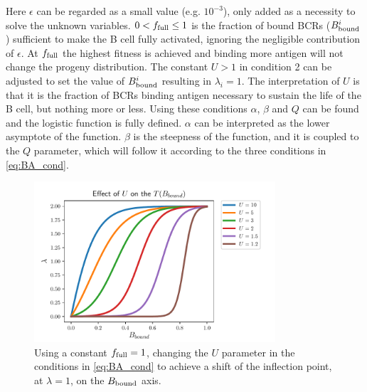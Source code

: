 Here $\epsilon$ can be regarded as a small value (e.g. $10^{-3}$), only added as a necessity to solve the unknown variables.
$0 < f_{\text{full}} \leq 1$ is the fraction of bound BCRs ($B^i_{\text{bound}}$) sufficient to make the B cell fully activated, ignoring the negligible contribution of $\epsilon$.
At $f_{\text{full}}$ the highest fitness is achieved and binding more antigen will not change the progeny distribution.
The constant $U > 1$ in condition 2 can be adjusted to set the value of $B^i_{\text{bound}}$ resulting in $\lambda_i = 1$.
The interpretation of $U$ is that it is the fraction of BCRs binding antigen necessary to sustain the life of the B cell, but nothing more or less.
Using these conditions $\alpha$, $\beta$ and $Q$ can be found and the logistic function is fully defined.
$\alpha$ can be interpreted as the lower asymptote of the function.
$\beta$ is the steepness of the function, and it is coupled to the $Q$ parameter, which will follow it according to the three conditions in \eqref{eq:BA_cond}.
\vfill

\begin{figure}
    \centering
    \includegraphics[width=0.8\textwidth]{figures/T_Bbound_U.pdf}
    \caption{
        \label{fig:T_Bbound_U}
        Using a constant $f_{\text{full}} = 1$, changing the $U$ parameter in the conditions in \eqref{eq:BA_cond} to achieve a shift of the inflection point, at $\lambda=1$, on the $B_{\text{bound}}$ axis.
    }
\end{figure}

